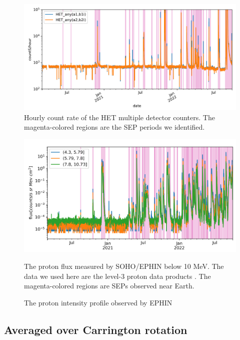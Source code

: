 \begin{figure}
    \centering
    \includegraphics[width = \textwidth]{images/ACR/SOLO-lvl2-trriger-V2.png}
    \caption[The multiple detector counters of \ac{HET}]{Hourly count rate of the \ac{HET} multiple detector counters. The magenta-colored regions are the \ac{SEP} periods we identified.}
    \label{Fig:solo-lvl2}
\end{figure}



\begin{figure}
    \centering
    \includegraphics[width = 1\textwidth]{images/ACR/SOLO-EPHIN-l3i-log2+6-proton-6H-V2.png}
    \caption{The proton intensity profile observed by \ac{EPHIN}}{The proton flux measured by \ac{SOHO}/\ac{EPHIN} below 10 MeV. The data we used here are the level-3 proton data products \citep{kuehl2020JSWSC}. The magenta-colored regions are \acp{SEP} observed near Earth.}
    \label{Fig:SOHO_EPHIN_Proton_flux}
\end{figure}

\subsection*{Averaged over Carrington rotation}

